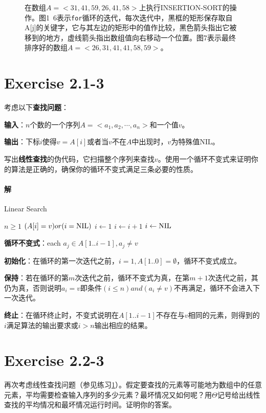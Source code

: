 \documentclass{article}
\begin{document}
\begin{figure}
\caption{在数组$A=<31,41,59,26,41,58>$上执行\textsc{INSERTION-SORT}的操作。图1~6表示\texttt{for}循环的迭代，每次迭代中，黑框的矩形保存取自A[j]的关键字，它与其左边的矩形中的值作比较，黑色箭头指出它被移到的地方，虚线箭头指出数组值向右移动一个位置。图7表示最终排序好的数组$A=<26,31,41,41,58,59>$。}
\label{fig:label}
\end{figure}

\section{Exercise 2.1-3} \label{2.1-3}
考虑以下\textbf{查找问题}：\par
\textbf{输入}：$n$个数的一个序列$A=<a_1,a_2,\cdots,a_n>$和一个值$v$。\par
\textbf{输出}：下标$i$使得$v=A[i]$或者当$v$不在$A$中出现时，$v$为特殊值$\mathrm{NIL}$。\par
写出\textbf{线性查找}的伪代码，它扫描整个序列来查找$v$。使用一个循环不变式来证明你的算法是正确的，确保你的循环不变式满足三条必要的性质。\\
\par
\paragraph{解}
\FloatBarrier
\begin{algorithm}[h]
\caption{Linear Search}
\begin{algorithmic}
\REQUIRE $n \geq 1$
\ENSURE $(A[i] = v)or(i = \textnormal{NIL})$
\STATE $i \gets 1$
\STATE $i \gets i + 1$
\ENDWHILE
{}
\STATE $i \gets \textnormal{NIL}$
\ENDIF
\end{algorithmic}
\end{algorithm}

\par
\textbf{循环不变式}：each $a_j \in A[1..i-1], a_j \neq v$ \par
\textbf{初始化}：在循环的第一次迭代之前，$i = 1, A[1..0] = \emptyset$，循环不变式成立。\par
\textbf{保持}：若在循环的第$m$次迭代之前，循环不变式为真，在第$m+1$次迭代之前，其仍为真，否则说明$a_i = v$即条件$(i \leq n ) and ( a_i \neq v)$不再满足，循环不会进入下一次迭代。 \par
\textbf{终止}：在循环终止时，不变式说明在$A[1..i-1]$不存在与$v$相同的元素，则得到的$i$满足算法的输出要求或$i > n$输出相应的结果。

\section{Exercise 2.2-3}
再次考虑线性查找问题（参见练习\ref{2.1-3}）。假定要查找的元素等可能地为数组中的任意元素，平均需要检查输入序列的多少元素？最坏情况又如何呢？用$\Theta$记号给出线性查找的平均情况和最坏情况运行时间。证明你的答案。\\
\par
\end{document}
